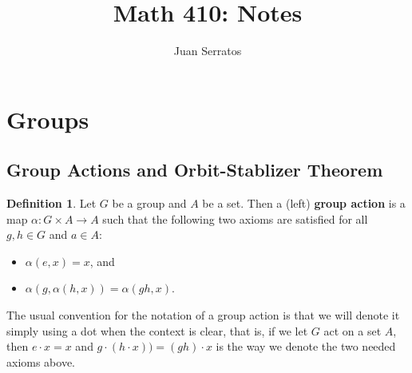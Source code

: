 \documentclass[9pt,reqno]{amsart}
\title{Math 410: Notes }
\author{Juan Serratos}
\theoremstyle{definition}
\newtheorem{defi}{Definition}[section]
\begin{document}
\maketitle
\section{Groups}
\subsection{Group Actions and Orbit-Stablizer Theorem}
\begin{defi}
Let $G$ be a group and $A$ be a set. Then a (left) \textbf{group action} is a map $\alpha \colon G \times A \to A$ such that the following two axioms are satisfied for all $g, h \in G$ and $a \in A$:
\begin{itemize}
	\item $\alpha (e, x) = x $, and
	\item $\alpha (g, \alpha (h, x)) = \alpha (gh, x)$.
\end{itemize}	
\end{defi}
The usual convention for the notation of a group action is that we will denote it simply using a dot when the context is clear, that is, if we let $G$ act on a set $A$, then $e \cdot x  = x$ and $ g \cdot (h \cdot x)) = (gh) \cdot x$ is the way we denote the two needed axioms above. 
\end{document}
